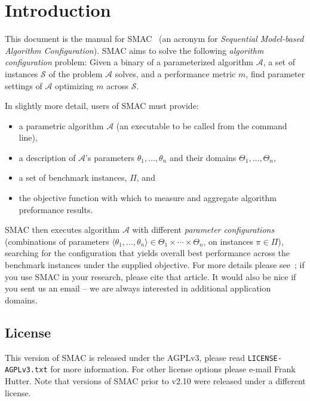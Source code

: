 \documentclass[manual.tex]{subfiles}
\begin{document}
\section{Introduction}\label{sec:intro}

This document is the manual for SMAC~\cite{HutHooLey11-SMAC} (an acronym for \emph{Sequential Model-based Algorithm Configuration}). SMAC aims to solve the following \emph{algorithm configuration} problem: Given a binary of a parameterized algorithm $\mathcal{A}$, a set of instances $\mathcal{S}$ of the problem $\mathcal{A}$ solves, and a performance metric $m$, find parameter settings of $\mathcal{A}$ optimizing $m$ across $\mathcal{S}$.

In slightly more detail, users of SMAC must provide:
\begin{itemize}
\item a parametric algorithm $\mathcal{A}$ (an executable to be called from
the command line), 
\item a description of $\mathcal{A}$'s parameters $\theta_1,\dots,\theta_n$ and their domains $\Theta_1, \dots, \Theta_n$, 
\item a set of benchmark instances, $\Pi$, and
\item the objective function with which to measure and aggregate algorithm preformance results.
\end{itemize}

SMAC then executes algorithm $\mathcal{A}$ with different \emph{parameter configurations} (combinations of parameters 
$\langle{}\theta_1,\dots,\theta_n\rangle{} \in \Theta_1 \times \cdots \times \Theta_n$, on instances $\pi \in \Pi$),
searching for the configuration that yields overall best performance across the benchmark instances under the supplied objective. For more details please see~\cite{HutHooLey11-SMAC}; if you use SMAC in your research, please cite that article. It would also be nice if you sent us an email -- we are always interested in additional application domains.

\subsection{License}

This version of SMAC is released under the AGPLv3, please read \texttt{LICENSE-AGPLv3.txt} for more information. For other license options please e-mail Frank Hutter. Note that versions of SMAC prior to v2.10 were released under a different license.
\end{document}
